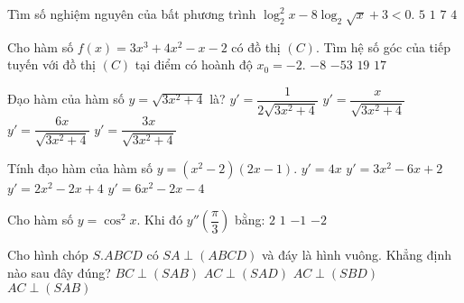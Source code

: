 \begin{ex}
\end{ex}
\begin{ex}
Tìm số nghiệm nguyên của bất phương trình $\log_2^2x-8\log_2\sqrt{x}+3<0$.
\choice
{\True $5$}
{$1$}
{$7$}
{$4$}
\end{ex}
\begin{ex}
Cho hàm số $f(x)=3x^3+4x^2-x-2$ có đồ thị $(C)$. Tìm hệ số góc của tiếp tuyến với đồ thị $(C)$ tại điểm có hoành độ $x_0=-2$.
\choice
{$-8$}
{$-53$}
{\True $19$}
{$17$}
\end{ex}
\begin{ex}
Đạo hàm của hàm số $y=\sqrt{3x^2+4}$ là?
\choice
{$y'=\dfrac{1}{2\sqrt{3x^2+4}}$}
{$y'=\dfrac{x}{\sqrt{3x^2+4}}$}
{$y'=\dfrac{6x}{\sqrt{3x^2+4}}$}
{\True $y'=\dfrac{3x}{\sqrt{3x^2+4}}$}
\end{ex}
\begin{ex}
Tính đạo hàm của hàm số $y=\left(x^2-2\right)(2x-1)$.
\choice
{$y'=4x$}
{$y'=3x^2-6x+2$}
{$y'=2x^2-2x+4$}
{\True $y'=6x^2-2x-4$}
\end{ex}
\begin{ex}
Cho hàm số $y=\cos^2x$. Khi đó $y''\left(\dfrac{\pi }{3}\right)$ bằng:
\choice
{$2$}
{\True $1$}
{$-1$}
{$-2$}
\end{ex}
\begin{ex}
Cho hình chóp $S.ABCD$ có $SA\perp (ABCD)$ và đáy là hình vuông. Khẳng định nào sau đây đúng?
\choice
{\True $BC\perp (SAB)$}
{$AC\perp (SAD)$}
{$AC\perp (SBD)$}
{$AC\perp (SAB)$}
\end{ex}

